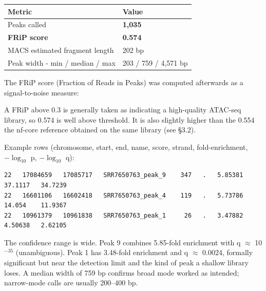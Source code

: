 \documentclass[
  11pt,
  a4paper,
]{article}
\newenvironment{Shaded}{}{}
\newcommand{\AttributeTok}[1]{\textcolor[rgb]{0.49,0.56,0.16}{#1}}
\newcommand{\BuiltInTok}[1]{\textcolor[rgb]{0.00,0.50,0.00}{#1}}
\newcommand{\CommentTok}[1]{\textcolor[rgb]{0.38,0.63,0.69}{\textit{#1}}}
\newcommand{\ExtensionTok}[1]{#1}
\newcommand{\FunctionTok}[1]{\textcolor[rgb]{0.02,0.16,0.49}{#1}}
\newcommand{\KeywordTok}[1]{\textcolor[rgb]{0.00,0.44,0.13}{\textbf{#1}}}
\newcommand{\NormalTok}[1]{#1}
\newcommand{\OperatorTok}[1]{\textcolor[rgb]{0.40,0.40,0.40}{#1}}
\newcommand{\StringTok}[1]{\textcolor[rgb]{0.25,0.44,0.63}{#1}}
\newcommand{\VariableTok}[1]{\textcolor[rgb]{0.10,0.09,0.49}{#1}}
\begin{document}
\begin{longtable}[]{@{}ll@{}}
\toprule\noalign{}
Metric & Value \\
\midrule\noalign{}
\endhead
\bottomrule\noalign{}
\endlastfoot
Peaks called & \textbf{1,035} \\
\textbf{FRiP score} & \textbf{0.574} \\
MACS estimated fragment length & 202 bp \\
Peak width - min / median / max & 203 / 759 / 4,571 bp \\
\end{longtable}

The FRiP score (Fraction of Reads in Peaks) was computed afterwards as a
signal-to-noise measure:

\begin{Shaded}
\end{Shaded}

A FRiP above 0.3 is generally taken as indicating a high-quality
ATAC-seq library, so 0.574 is well above threshold. It is also slightly
higher than the 0.554 the nf-core reference obtained on the same library
(see §3.2).

Example rows (chromosome, start, end, name, score, strand,
fold-enrichment, \(-\log_{10}\) p, \(-\log_{10}\) q):

\begin{verbatim}
22   17084659   17085717   SRR7650763_peak_9    347   .   5.85381   37.1117   34.7239
22   16601106   16602418   SRR7650763_peak_4    119   .   5.73786   14.054    11.9367
22   10961379   10961838   SRR7650763_peak_1     26   .   3.47882    4.50638   2.62105
\end{verbatim}

The confidence range is wide. Peak 9 combines 5.85-fold enrichment with
q \(\approx\) 10\(^{-35}\) (unambiguous). Peak 1 has 3.48-fold
enrichment and q \(\approx\) 0.0024, formally significant but near the
detection limit and the kind of peak a shallow library loses. A median
width of 759 bp confirms broad mode worked as intended; narrow-mode
calls are usually 200--400 bp.
\end{document}
